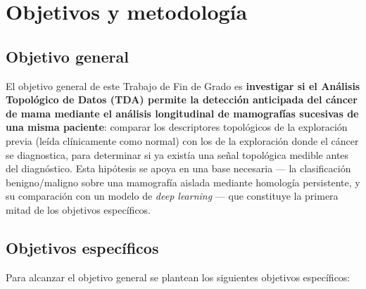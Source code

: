 \chapter{Objetivos y metodología}
\label{cap:objetivos}

\section{Objetivo general}
El objetivo general de este Trabajo de Fin de Grado es \textbf{investigar si
el Análisis Topológico de Datos (TDA) permite la detección anticipada del
cáncer de mama mediante el análisis longitudinal de mamografías sucesivas de
una misma paciente}: comparar los descriptores topológicos de la exploración
previa (leída clínicamente como normal) con los de la exploración donde el
cáncer se diagnostica, para determinar si ya existía una señal topológica
medible antes del diagnóstico. Esta hipótesis se apoya en una base necesaria
--- la clasificación benigno/maligno sobre una mamografía aislada mediante
homología persistente, y su comparación con un modelo de \textit{deep
learning} --- que constituye la primera mitad de los objetivos específicos.

\section{Objetivos específicos}
Para alcanzar el objetivo general se plantean los siguientes objetivos
específicos:

